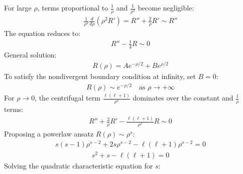 \documentclass[letterpaper,10pt,english]{jupyterBook}
\begin{document}
\sphinxAtStartPar
{} For large \(\rho\), terms proportional to \(\frac{1}{\rho}\) and \(\frac{1}{\rho^2}\) become negligible:
\begin{equation*}
\begin{split}\frac{1}{\rho^2} \frac{d}{d\rho} \left( \rho^2 R' \right) = R'' + \frac{2}{\rho} R' \sim R''\end{split}
\end{equation*}
\sphinxAtStartPar
The equation reduces to:
\begin{equation*}
\begin{split}R'' - \frac{1}{4} R \sim 0\end{split}
\end{equation*}
\sphinxAtStartPar
General solution:
\begin{equation*}
\begin{split}R(\rho) = A e^{-\rho/2} + B e^{\rho/2}\end{split}
\end{equation*}
\sphinxAtStartPar
To satisfy the non\sphinxhyphen{}divergent boundary condition at infinity, set \(B = 0\):
\begin{equation*}
\begin{split}R(\rho) \sim e^{-\rho/2} \quad \text{as } \rho \to +\infty\end{split}
\end{equation*}
\sphinxAtStartPar
{} For \(\rho \to 0\), the centrifugal term \(\frac{\ell(\ell+1)}{\rho^2}\) dominates over the constant and \(\frac{1}{\rho}\) terms:
\begin{equation*}
\begin{split}R'' + \frac{2}{\rho} R' - \frac{\ell(\ell + 1)}{\rho^2} R \sim 0\end{split}
\end{equation*}
\sphinxAtStartPar
Proposing a power\sphinxhyphen{}law ansatz \(R(\rho) \sim \rho^s\):
\begin{equation*}
\begin{split}s(s - 1) \rho^{s-2} + 2s \rho^{s-2} - \ell(\ell + 1) \rho^{s-2} = 0\end{split}
\end{equation*}\begin{equation*}
\begin{split}s^2 + s - \ell(\ell + 1) = 0\end{split}
\end{equation*}
\sphinxAtStartPar
Solving the quadratic characteristic equation for \(s\):
\end{document}
